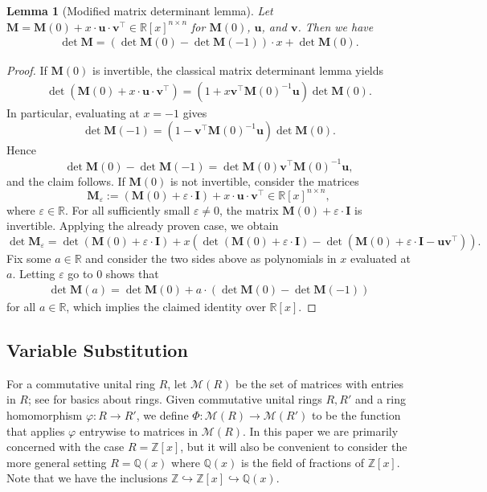 \documentclass[a4paper, 11pt]{article}
\newcommand{\R}{\mathbb{R}}
\newcommand{\Z}{\mathbb{Z}}
\newcommand{\bv}{\bm{v}}
\newcommand{\bu}{\bm{u}}
\newcommand{\bM}{\bm{M}}
\newcommand{\indet}{x}
\newcommand{\polyring}{\Z[\indet]}
\newcommand{\polyM}{\bM}
\newcommand{\id}{\bm{I}}
\newtheorem{lemma}{Lemma}
\begin{document}
	\begin{lemma}[Modified matrix determinant lemma]
		\label{lemma_matrix_determinant_lemma}
		Let $\polyM = \bM(0)+ \indet \cdot\bu\cdot\bv^\top\in\R[\indet]^{n\times n}$ for $\bM(0)$, $\bu$, and $\bv$. Then we have
		\begin{align*}
			\det \polyM = (\det\bM(0) - \det\bM(-1))\cdot \indet + \det\bM(0).
		\end{align*}
	\end{lemma}
	\begin{proof}
		If $\bM(0)$ is invertible, the classical matrix determinant lemma yields 
		\begin{align*}
			\det\left(\bM(0)+\indet\cdot\bu\cdot\bv^\top\right) = \left(1+\indet\bv^\top \bM(0)^{-1}\bu\right)\det\bM(0).
		\end{align*}
		In particular, evaluating at $\indet = -1$ gives
		\[
		\det\bM(-1)=\left(1-\bv^\top \bM(0)^{-1}\bu\right)\det\bM(0).
		\]
		Hence
		\[
		\det\bM(0)-\det\bM(-1)
		=\det\bM(0)\bv^\top \bM(0)^{-1}\bu,
		\]
		and the claim follows. If $\bM(0)$ is not invertible, consider the matrices
		\[
		\bM_\varepsilon := \left(\bM(0) + \varepsilon\cdot \id\right) + \indet \cdot\bu\cdot\bv^\top\in\R[\indet]^{n\times n},
		\]
		where $\varepsilon\in\mathbb{R}$.
		For all sufficiently small $\varepsilon\neq 0$, the matrix $\bM(0) + \varepsilon\cdot \id$ is invertible. Applying the already proven case, we obtain
		\[
		\det\bM_\varepsilon
		=
		\det(\bM(0) + \varepsilon\cdot \id)
		+ \indet\left(\det(\bM(0) + \varepsilon\cdot \id)-\det(\bM(0) + \varepsilon \cdot\id-\bu\bv^\top)\right).
		\]
		Fix some $a\in\R$ and consider the two sides above as polynomials in $\indet$ evaluated at $a$. Letting $\varepsilon$ go to $0$ shows that 
		\begin{align*}
			\det\bM(a) = \det\bM(0) + a\cdot\left(\det\bM(0) - \det\bM(-1)\right)
		\end{align*}
		for all $a\in \R$, which implies the claimed identity over $\R[x]$.
	\end{proof}
	
	\subsection{Variable Substitution}
	
	For a commutative unital ring $R$, let $\mathcal{M}(R)$ be the set of matrices with entries in $R$; see \cite[Chapter 2]{langalgebra} for basics about rings. Given commutative unital rings $R,R'$ and a ring homomorphism $\varphi:R\rightarrow R'$, we define $\Phi:\mathcal{M}(R)\rightarrow \mathcal{M}(R')$ to be the function that applies $\varphi$ entrywise to matrices in $\mathcal{M}(R)$. In this paper we are primarily concerned with the case $R=\polyring$, but it will also be convenient to consider the more general setting $R=\mathbb{Q}(x)$ where $\mathbb{Q}(x)$ is the field of fractions of $\polyring$. Note that we have the inclusions $\Z\hookrightarrow\polyring\hookrightarrow\mathbb{Q}(x)$. 
	
\end{document}
